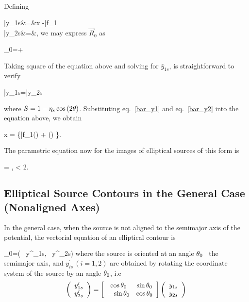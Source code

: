 Defining

\bea
\bar{y}_{1s}&=&\kt x -\bar{f}_1\label{bar_y1}\\
\bar{y}_{2s}&=&,\label{bar_y2}
\eea
we may express $\vec{R}_0$ as

\beq
{}_0=\hat{\imath}+\hat{\jmath}
\eeq

Taking square of the equation above and solving for $\bar{y}_{1s}$, is straightforward to verify

\beq
\bar{y}_{1s}=\bar{y}_{2s}\pm {}
\eeq

where $S=1-\eta_s\cos{(2\theta)}$. Substituting eq.~\eqref{bar_y1} and eq.~\eqref{bar_y2} into the equation above, we obtain

\beq
x =  \left\{\bar{f}_{1}(\theta) + \left(\right) \pm {}  \right\}.
\label{elliptical_contour}
\eeq

The parametric equation now for the images of elliptical sources of this form is

\beq
{}= ,  \leq \te < 2\pi.
\eeq


\subsection{Elliptical Source Contours in the General Case (Nonaligned Axes)}

In the general case, when the source is not aligned to the semimajor axis of the potential, the vectorial equation of an elliptical contour is

\beq
\label{eq:ellipsetheta}
_0=\left( \, y^\prime_{1s}, \, y^\prime_{2s}\right)
\eeq
where the source is oriented at an angle
$\theta_0$ \wrt\ the  semimajor axis,  and $y^\prime_{is}\, (i=1,2)$ are obtained by rotating the coordinate system of the source by an angle $\theta_0$,
i.e
\begin{equation}
\left(\begin{array}{c}y^\prime_{1s} \\ y^\prime_{2s} \end{array}\right)=\left[\begin{array}{c c}%
\cos{\te_0} & \sin{\te_0}\\ -\sin{\te_0} & \cos{\te_0} \end{array} \right]\left( \begin{array}{c} y_{1s}\\ y_{2s}\end{array}\right)
\end{equation}

